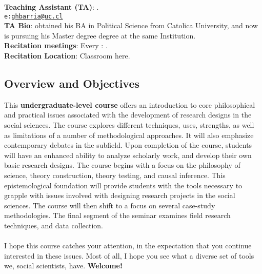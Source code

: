 \documentclass[letterpaper]{article}
\begin{document}
\vspace{0.5cm}
{\bf Teaching Assistant (TA)}: {\unskip}.\\
\texttt{e:}\href{mailto:ghbarria@uc.cl}{\texttt{ghbarria@uc.cl}}\\
{\bf TA Bio}: {\unskip} obtained his BA in Political Science from Catolica University, and now is pursuing his Master degree degree at the same Institution.\\
{\bf Recitation meetings}: Every {\unskip}: {\unskip}.\\
{\bf Recitation Location}: {\color{red}Classroom here}.\\



\subsection*{Overview and Objectives}

This {\bf {\color{blue}undergraduate-level course}} offers an introduction to core philosophical and practical issues associated with the development of research designs in the social sciences. The course explores different techniques, uses, strengths, as well as limitations of a number of methodological approaches. It will also emphasize contemporary debates in the subfield. Upon completion of the course, students will have an enhanced ability to analyze scholarly work, and develop their own basic research designs. The course begins with a focus on the philosophy of science, theory construction, theory testing, and causal inference. This epistemological foundation will provide students with the tools necessary to grapple with issues involved with designing research projects in the social sciences. The course will then shift to a focus on several case-study methodologies. The final segment of the seminar examines field research techniques, and data collection.
\\
\\
I hope this course catches your attention, in the expectation that you continue interested in these issues. Most of all, I hope you see what a diverse set of tools we, social scientists, have. {\bf Welcome!}
\end{document}
